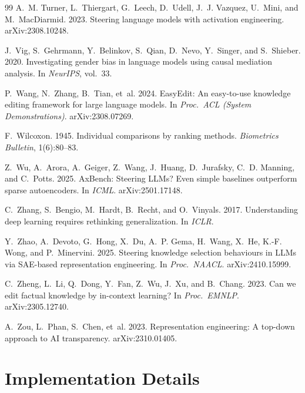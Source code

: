 \documentclass[11pt,twocolumn]{article}
\begin{document}
\begin{thebibliography}{99}
 A.~M. Turner, L.~Thiergart, G.~Leech, D.~Udell, J.~J. Vazquez, U.~Mini, and M.~MacDiarmid. 2023. Steering language models with activation engineering. arXiv:2308.10248.

 J.~Vig, S.~Gehrmann, Y.~Belinkov, S.~Qian, D.~Nevo, Y.~Singer, and S.~Shieber. 2020. Investigating gender bias in language models using causal mediation analysis. In \textit{NeurIPS}, vol.~33.

 P.~Wang, N.~Zhang, B.~Tian, et~al. 2024. EasyEdit: An easy-to-use knowledge editing framework for large language models. In \textit{Proc.\ ACL (System Demonstrations)}. arXiv:2308.07269.

 F.~Wilcoxon. 1945. Individual comparisons by ranking methods. \textit{Biometrics Bulletin}, 1(6):80--83.

 Z.~Wu, A.~Arora, A.~Geiger, Z.~Wang, J.~Huang, D.~Jurafsky, C.~D. Manning, and C.~Potts. 2025. AxBench: Steering LLMs? Even simple baselines outperform sparse autoencoders. In \textit{ICML}. arXiv:2501.17148.

 C.~Zhang, S.~Bengio, M.~Hardt, B.~Recht, and O.~Vinyals. 2017. Understanding deep learning requires rethinking generalization. In \textit{ICLR}.

 Y.~Zhao, A.~Devoto, G.~Hong, X.~Du, A.~P. Gema, H.~Wang, X.~He, K.-F. Wong, and P.~Minervini. 2025. Steering knowledge selection behaviours in LLMs via SAE-based representation engineering. In \textit{Proc.\ NAACL}. arXiv:2410.15999.

 C.~Zheng, L.~Li, Q.~Dong, Y.~Fan, Z.~Wu, J.~Xu, and B.~Chang. 2023. Can we edit factual knowledge by in-context learning? In \textit{Proc.\ EMNLP}. arXiv:2305.12740.

 A.~Zou, L.~Phan, S.~Chen, et~al. 2023. Representation engineering: A top-down approach to AI transparency. arXiv:2310.01405.
\end{thebibliography}
\endgroup

\appendix
\onecolumn
\section{Implementation Details}
\label{app:impl}
\end{document}
